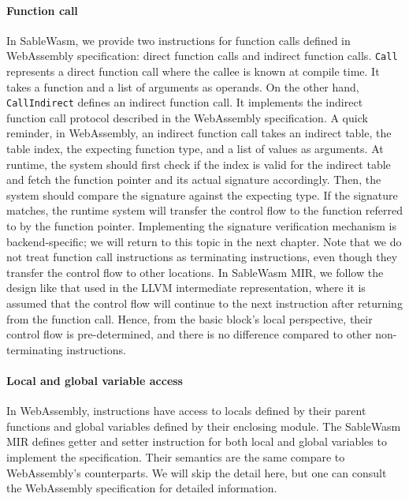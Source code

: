 \paragraph{Function call}
In SableWasm, we provide two instructions for function calls defined in
WebAssembly specification: direct function calls and indirect function calls.
\texttt{Call} represents a direct function call where the callee is known at
compile time. It takes a function and a list of arguments as operands. On the
other hand, \texttt{CallIndirect} defines an indirect function call. It
implements the indirect function call protocol described in the WebAssembly
specification. A quick reminder, in WebAssembly, an indirect function call takes
an indirect table, the table index, the expecting function type, and a list of
values as arguments. At runtime, the system should first check if the index is
valid for the indirect table and fetch the function pointer and its actual
signature accordingly. Then, the system should compare the signature against the
expecting type. If the signature matches, the runtime system will
transfer the control flow to the function referred to by the function pointer.
Implementing the signature verification mechanism is backend-specific; we will
return to this topic in the next chapter. Note that we do not treat function
call instructions as terminating instructions, even though they transfer the
control flow to other locations. In SableWasm MIR, we follow the design like
that used in the LLVM intermediate representation, where it is assumed that
the control flow will continue to the next instruction after returning from the
function call. Hence, from the basic block's local perspective, their control
flow is pre-determined, and there is no difference compared to other
non-terminating instructions.

\paragraph{Local and global variable access}
In WebAssembly, instructions have access to locals defined by their parent
functions and global variables defined by their enclosing module. The SableWasm
MIR defines getter and setter instruction for both local and global variables to
implement the specification. Their semantics are the same compare to
WebAssembly's counterparts. We will skip the detail here, but one can consult
the WebAssembly specification for detailed information.

